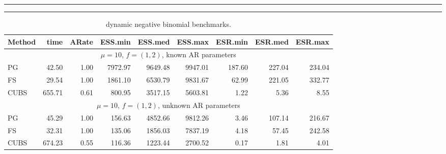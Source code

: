 \documentclass[12pt]{article}
\begin{document}

\begin{table}

  \begin{center}
    \caption{\label{tab:dynnb-detail} dynamic negative binomial benchmarks.}
    \hrule
    \vspace{2pt}
    \hrule
  \end{center}

  \begin{center}
    \small
    \begin{tabular}{l r r r r r r r r }
      Method  &    time  &   ARate  &  ESS.min  &  ESS.med  &  ESS.max  &  ESR.min  & ESR.med  &  ESR.max \\
      \hline

      \multicolumn{9}{c}{$\mu=10$, $f = (1,2)$, known AR parameters} \\
      PG   &    42.50 &     1.00 &   7972.97 &   9649.48 &   9947.01 &    187.60 &    227.04 &    234.04 \\
      FS   &    29.54 &     1.00 &   1861.10 &   6530.79 &   9831.67 &     62.99 &    221.05 &    332.77 \\
      CUBS   &   655.71 &     0.61 &    800.95 &   3517.15 &   5603.81 &      1.22 &      5.36 &      8.55
      \\ %

      \multicolumn{9}{c}{$\mu=10$, $f = (1,2)$, unknown AR parameters} \\
      PG   &    45.29 &     1.00 &    156.63 &   4852.66 &   9812.26 &      3.46 &    107.14 &    216.67 \\
      FS   &    32.31 &     1.00 &    135.06 &   1856.03 &   7837.19 &      4.18 &     57.45 &    242.58 \\
      CUBS   &   674.23 &     0.55 &    116.36 &   1223.44 &   2700.52 &      0.17 &      1.81 &      4.01
      \\ %


\end{tabular}
\end{center}
\end{table}
\end{document}
